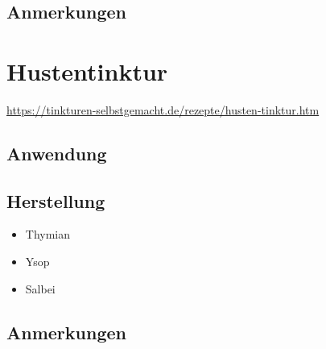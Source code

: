 \subsection{Anmerkungen}




\section{Hustentinktur}

\cite{tinkturen}  

\url{https://tinkturen-selbstgemacht.de/rezepte/husten-tinktur.htm} 


\subsection{Anwendung}

\subsection{Herstellung}

\begin{itemize}
	\item Thymian
	\item Ysop
	\item Salbei
\end{itemize}

\subsection{Anmerkungen}











